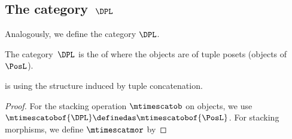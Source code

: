 {\subsection{The category~$\DPL$}

Analogously, we define the category $\DPL$.

\begin{definition}\label{def:DPL}
    The category~$\DPL$ is the  of \DP where the objects are  of tuple posets (objects of $\PosL$).
\end{definition}
\begin{lemma}
    \DPL is  using the structure induced by tuple concatenation.
\end{lemma}
\begin{widepar}
    \begin{proof}
        For the stacking operation $\mtimescatob$ on objects, we use $\mtimescatobof{\DPL}\definedas\mtimescatobof{\PosL}$.
        For stacking morphisms, we define $\mtimescatmor$ by

\end{proof}
\end{widepar}}
